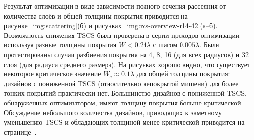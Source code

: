 Результат оптимизации в виде зависимости полного сечения рассеяния от
количества слоёв и общей толщины покрытия приводится на
рисунке~\ref{img:scattering}(б) и
рисунках~\ref{img:rcs-overview-r14-42}(а--б). Возможность снижения TSCS
была проверена в серии проходов оптимизации используя разные толщины
покрытия ${W < 0.24\lambda}$ с шагом $0.005\lambda$. Были
протестированы случаи разбиения покрытия на 4, 8, 16 (для всех
радиусов) и 32 слоя (для радиуса среднего размера). На рисунках хорошо
видно, что существует некоторое критическое значение
${W_c \approx 0.1\lambda}$ для общей толщины покрытия: дизайнов с
пониженной TSCS (относительно непокрытой мишени) для более тонких
покрытий практически нет. Большинство дизайнов с пониженной TSCS,
обнаруженных оптимизатором, имеют толщину покрытия больше
критической. Обсуждение небольшого количества дизайнов, приводящих к
заметному уменьшению TSCS и обладающих толщиной менее критической приводится на
странице~\pageref{ref:thin-designs}\label{backref:thin-designs}.


